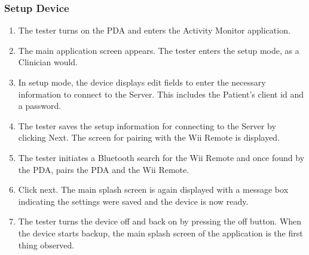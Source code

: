 \documentclass{article}
\begin{document}
\subsubsection{Setup Device}
\begin{enumerate}
\item The tester turns on the PDA and enters the Activity Monitor application.
\item The main application screen appears. The tester enters the setup mode, as a Clinician would.
\item In setup mode, the device displays edit fields to enter the necessary information to connect to the Server. This includes the Patient's client id and a password.
\item The tester saves the setup information for connecting to the Server by clicking Next. The screen for pairing with the Wii Remote is displayed.
\item The tester initiates a Bluetooth search for the Wii Remote and once found by the PDA, pairs the PDA and the Wii Remote.
\item Click next. The main splash screen is again displayed with a message box indicating the settings were saved and the device is now ready.
\item The tester turns the device off and back on by pressing the off button. When the device starts backup, the main splash screen of the application is the first thing observed.
\end{enumerate}
\end{document}
